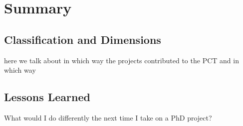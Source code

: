 \chapter[Summary]{Summary}\label{chap:summary}



\section{Classification and Dimensions}
here we talk about in which way the projects contributed to the PCT and in which way


\section{Lessons Learned}
What would I do differently the next time I take on a PhD project?




